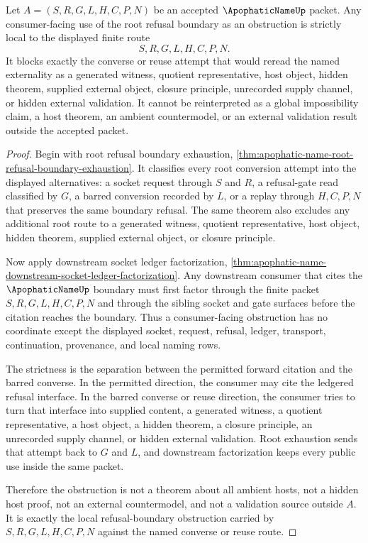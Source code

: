 \begin{corollary}
\label{cor:apophatic-name-root-refusal-boundary-strict-obstruction}
Let $A=(S,R,G,L,H,C,P,N)$ be an accepted $\ApophaticNameUp$ packet. Any consumer-facing use of the root refusal boundary as an obstruction is strictly local to the displayed finite route
$$
S,R,G,L,H,C,P,N.
$$
It blocks exactly the converse or reuse attempt that would reread the named externality as a generated witness, quotient representative, host object, hidden theorem, supplied external object, closure principle, unrecorded supply channel, or hidden external validation. It cannot be reinterpreted as a global impossibility claim, a host theorem, an ambient countermodel, or an external validation result outside the accepted packet.
\end{corollary}
\begin{proof}
Begin with root refusal boundary exhaustion, \autoref{thm:apophatic-name-root-refusal-boundary-exhaustion}. It classifies every root conversion attempt into the displayed alternatives: a socket request through $S$ and $R$, a refusal-gate read classified by $G$, a barred conversion recorded by $L$, or a replay through $H,C,P,N$ that preserves the same boundary refusal. The same theorem also excludes any additional root route to a generated witness, quotient representative, host object, hidden theorem, supplied external object, or closure principle.

Now apply downstream socket ledger factorization, \autoref{thm:apophatic-name-downstream-socket-ledger-factorization}. Any downstream consumer that cites the $\ApophaticNameUp$ boundary must first factor through the finite packet $S,R,G,L,H,C,P,N$ and through the sibling socket and gate surfaces before the citation reaches the boundary. Thus a consumer-facing obstruction has no coordinate except the displayed socket, request, refusal, ledger, transport, continuation, provenance, and local naming rows.

The strictness is the separation between the permitted forward citation and the barred converse. In the permitted direction, the consumer may cite the ledgered refusal interface. In the barred converse or reuse direction, the consumer tries to turn that interface into supplied content, a generated witness, a quotient representative, a host object, a hidden theorem, a closure principle, an unrecorded supply channel, or hidden external validation. Root exhaustion sends that attempt back to $G$ and $L$, and downstream factorization keeps every public use inside the same packet.

Therefore the obstruction is not a theorem about all ambient hosts, not a hidden host proof, not an external countermodel, and not a validation source outside $A$. It is exactly the local refusal-boundary obstruction carried by $S,R,G,L,H,C,P,N$ against the named converse or reuse route.
\end{proof}
